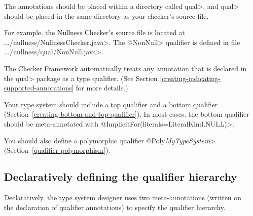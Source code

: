 The annotations should be placed within a directory called \<qual>, and
\<qual> should be placed in the same directory as your checker's source file.

For example, the Nullness Checker's source file is located at
\<.../nullness/NullnessChecker.java>. The \<@NonNull> qualifier is defined in
file \<.../nullness/qual/NonNull.java>.

The Checker Framework automatically treats any annotation that
is declared in the \<qual> package as a type qualifier.
(See Section \ref{creating-indicating-supported-annotations} for more details.)


Your type system should include a top qualifier and a bottom qualifier
(Section~\ref{creating-bottom-and-top-qualifier}).
In most cases, the bottom qualifier should be meta-annotated with
\<@ImplicitFor(literals=LiteralKind.NULL)>.

You should also define a
polymorphic qualifier \<@Poly\emph{MyTypeSystem}>
(Section~\ref{qualifier-polymorphism}).


\subsection{Declaratively defining the qualifier hierarchy\label{creating-declarative-hierarchy}}

Declaratively, the type system designer uses two meta-annotations (written
on the declaration of qualifier annotations) to specify the qualifier
hierarchy.

